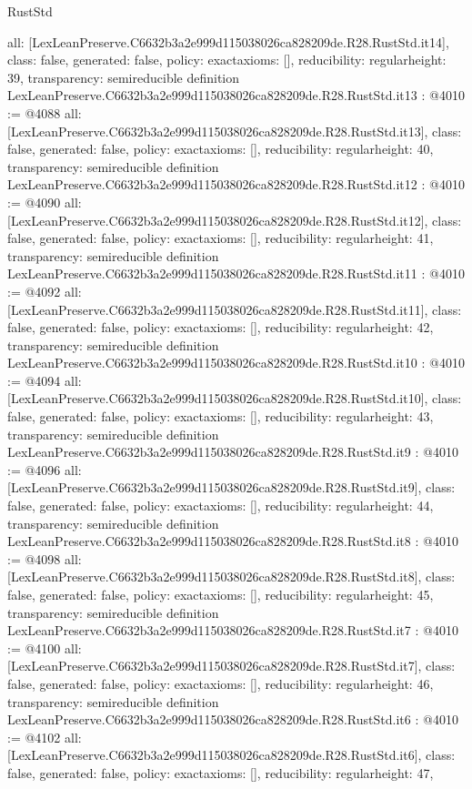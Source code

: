 \begin{lexlean}{RustStd}
\begin{coremodule}
{  all: [LexLeanPreserve.C6632b3a2e999d115038026ca828209de.R28.RustStd.it14],
  class: false,
  generated: false,
  policy: exact{axioms: []},
  reducibility: regular{height: 39},
  transparency: semireducible
}
definition LexLeanPreserve.C6632b3a2e999d115038026ca828209de.R28.RustStd.it13 : @4010 := @4088 {
  all: [LexLeanPreserve.C6632b3a2e999d115038026ca828209de.R28.RustStd.it13],
  class: false,
  generated: false,
  policy: exact{axioms: []},
  reducibility: regular{height: 40},
  transparency: semireducible
}
definition LexLeanPreserve.C6632b3a2e999d115038026ca828209de.R28.RustStd.it12 : @4010 := @4090 {
  all: [LexLeanPreserve.C6632b3a2e999d115038026ca828209de.R28.RustStd.it12],
  class: false,
  generated: false,
  policy: exact{axioms: []},
  reducibility: regular{height: 41},
  transparency: semireducible
}
definition LexLeanPreserve.C6632b3a2e999d115038026ca828209de.R28.RustStd.it11 : @4010 := @4092 {
  all: [LexLeanPreserve.C6632b3a2e999d115038026ca828209de.R28.RustStd.it11],
  class: false,
  generated: false,
  policy: exact{axioms: []},
  reducibility: regular{height: 42},
  transparency: semireducible
}
definition LexLeanPreserve.C6632b3a2e999d115038026ca828209de.R28.RustStd.it10 : @4010 := @4094 {
  all: [LexLeanPreserve.C6632b3a2e999d115038026ca828209de.R28.RustStd.it10],
  class: false,
  generated: false,
  policy: exact{axioms: []},
  reducibility: regular{height: 43},
  transparency: semireducible
}
definition LexLeanPreserve.C6632b3a2e999d115038026ca828209de.R28.RustStd.it9 : @4010 := @4096 {
  all: [LexLeanPreserve.C6632b3a2e999d115038026ca828209de.R28.RustStd.it9],
  class: false,
  generated: false,
  policy: exact{axioms: []},
  reducibility: regular{height: 44},
  transparency: semireducible
}
definition LexLeanPreserve.C6632b3a2e999d115038026ca828209de.R28.RustStd.it8 : @4010 := @4098 {
  all: [LexLeanPreserve.C6632b3a2e999d115038026ca828209de.R28.RustStd.it8],
  class: false,
  generated: false,
  policy: exact{axioms: []},
  reducibility: regular{height: 45},
  transparency: semireducible
}
definition LexLeanPreserve.C6632b3a2e999d115038026ca828209de.R28.RustStd.it7 : @4010 := @4100 {
  all: [LexLeanPreserve.C6632b3a2e999d115038026ca828209de.R28.RustStd.it7],
  class: false,
  generated: false,
  policy: exact{axioms: []},
  reducibility: regular{height: 46},
  transparency: semireducible
}
definition LexLeanPreserve.C6632b3a2e999d115038026ca828209de.R28.RustStd.it6 : @4010 := @4102 {
  all: [LexLeanPreserve.C6632b3a2e999d115038026ca828209de.R28.RustStd.it6],
  class: false,
  generated: false,
  policy: exact{axioms: []},
  reducibility: regular{height: 47},
}
\end{coremodule}
\end{lexlean}
